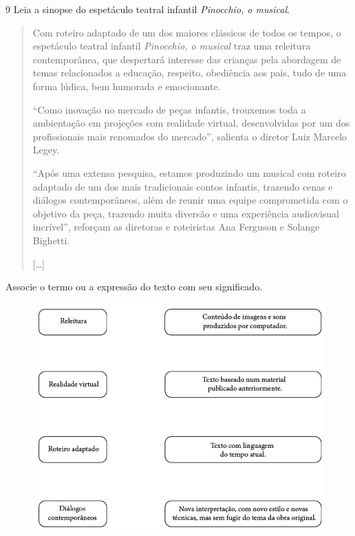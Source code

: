 

\num{9} Leia a sinopse do espetáculo teatral infantil \emph{Pinocchio, o musical}.

\begin{quote}
Com roteiro adaptado de um dos maiores clássicos de todos os tempos, o
espetáculo teatral infantil \textit{Pinocchio, o musical} traz uma releitura
contemporânea, que despertará interesse das crianças pela abordagem de
temas relacionados a educação, respeito, obediência aos pais, tudo de
uma forma lúdica, bem humorada e emocionante.

“Como inovação no mercado de peças infantis, trouxemos toda a
ambientação em projeções com realidade virtual, desenvolvidas por um dos
profissionais mais renomados do mercado”, salienta o diretor Luiz
Marcelo Legey.

“Após uma extensa pesquisa, estamos produzindo um musical com roteiro
adaptado de um dos mais tradicionais contos infantis, trazendo cenas e
diálogos contemporâneos, além de reunir uma equipe comprometida com o
objetivo da peça, trazendo muita diversão e uma experiência audiovisual
incrível”, reforçam as diretoras e roteiristas Ana Ferguson e Solange
Bighetti.

{[}\ldots{}{]}

\end{quote}

\pagebreak
Associe o termo ou a expressão do texto com seu significado.

\begin{figure}[htpb!]
\includegraphics[width=\textwidth]{../ilustracoes/ART5/SAEB_5ANO_ART_FIGURA7.png}
\end{figure}

